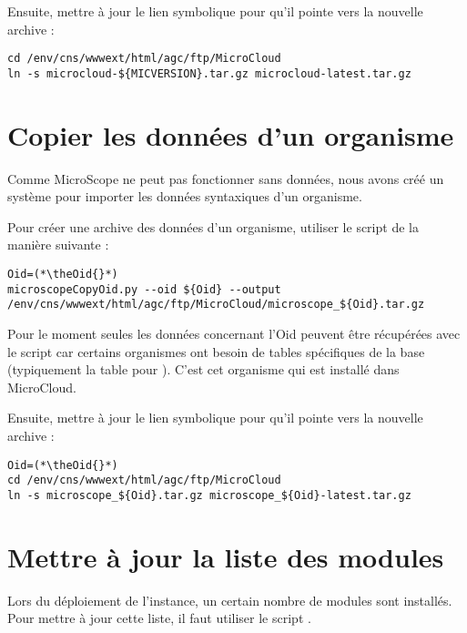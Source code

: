 Ensuite, mettre à jour le lien symbolique pour qu'il pointe vers la nouvelle archive :
\begin{lstlisting}[style=bash]
cd /env/cns/wwwext/html/agc/ftp/MicroCloud
ln -s microcloud-${MICVERSION}.tar.gz microcloud-latest.tar.gz
\end{lstlisting}

\section{Copier les données d'un organisme} \label{sec:nouvelle_donne_organisme}

Comme MicroScope ne peut pas fonctionner sans données, nous avons créé un système
pour importer les données syntaxiques d'un organisme.

Pour créer une archive des données d'un organisme, utiliser le script  de la manière suivante :
\begin{lstlisting}[style=bash]
Oid=(*\theOid{}*)
microscopeCopyOid.py --oid ${Oid} --output /env/cns/wwwext/html/agc/ftp/MicroCloud/microscope_${Oid}.tar.gz
\end{lstlisting}

\begin{warningbox}
    Pour le moment seules les données concernant l'Oid \theOid{} peuvent être récupérées avec le script  car certains organismes ont besoin de tables spécifiques de la base  (typiquement la table  pour \theOrg{}).
    C'est cet organisme qui est installé dans MicroCloud.
\end{warningbox}

Ensuite, mettre à jour le lien symbolique pour qu'il pointe vers la nouvelle archive :
\begin{lstlisting}[style=bash]
Oid=(*\theOid{}*)
cd /env/cns/wwwext/html/agc/ftp/MicroCloud
ln -s microscope_${Oid}.tar.gz microscope_${Oid}-latest.tar.gz
\end{lstlisting}

\section{Mettre à jour la liste des modules} \label{sec:nouvelle_liste_modules}

Lors du déploiement de l'instance, un certain nombre de modules sont installés.
Pour mettre à jour cette liste, il faut utiliser le script .

